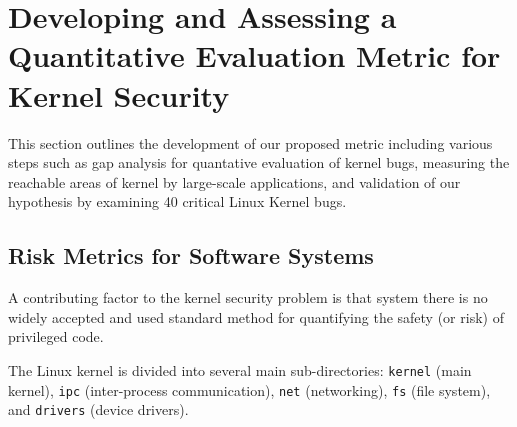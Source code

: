 \section{Developing and Assessing a Quantitative Evaluation Metric for Kernel Security}
\label{sec.metric}




This section outlines the development of our proposed metric including various steps such as gap analysis for quantative evaluation of kernel bugs, measuring the reachable areas of kernel by large-scale applications, and validation of our hypothesis by examining 40 critical Linux Kernel bugs.


\subsection{Risk Metrics for Software Systems}

A contributing factor to the kernel security problem is that system there is no widely accepted and used standard method for quantifying the safety (or risk) of privileged code.  


The Linux kernel is divided into several main sub-directories:
\texttt{kernel} (main kernel), \texttt{ipc} (inter-process communication),
\texttt{net} (networking), \texttt{fs} (file system), and \texttt{drivers} (device drivers).

